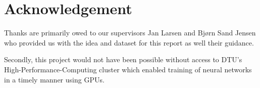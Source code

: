 \section{Acknowledgement}
Thanks are primarily owed to our supervisors Jan Larsen and Bjørn Sand Jensen who provided us with the idea and dataset for this report as well their guidance.

Secondly, this project would not have been possible without access to DTU's High-Performance-Computing cluster which enabled training of neural networks in a timely manner using GPUs.
